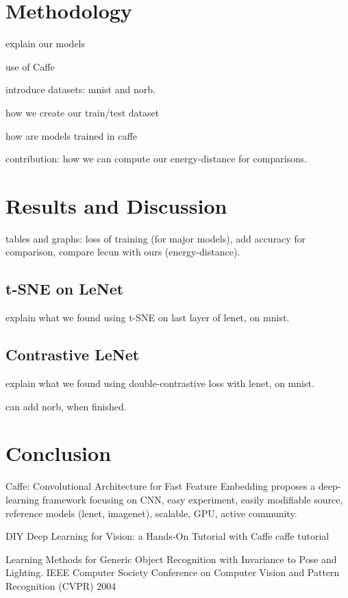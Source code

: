 \documentclass[a4paper,12pt]{report}
\begin{document}
\chapter{Methodology}

explain our models

use of Caffe

introduce datasets: mnist and norb.

how we create our train/test dataset

how are models trained in caffe

contribution: how we can compute our energy-distance for comparisons.


\chapter{Results and Discussion}

tables and graphs: loss of training (for major models), add accuracy for comparison, compare lecun with ours (energy-distance).

\section{t-SNE on LeNet}
explain what we found using t-SNE on last layer of lenet, on mnist.

\section{Contrastive LeNet}
explain what we found using double-contrastive loss with lenet, on mnist.

can add norb, when finished.


\chapter{Conclusion}

{}


Caffe: Convolutional Architecture for Fast Feature Embedding
proposes a deep-learning framework focusing on CNN, easy experiment, easily modifiable source, reference models (lenet, imagenet), scalable, GPU, active community.

DIY Deep Learning for Vision: a Hands-On Tutorial with Caffe
caffe tutorial

Learning Methods for Generic Object Recognition with Invariance to Pose and Lighting. IEEE Computer Society Conference on Computer Vision and Pattern Recognition (CVPR) 2004
\end{document}
